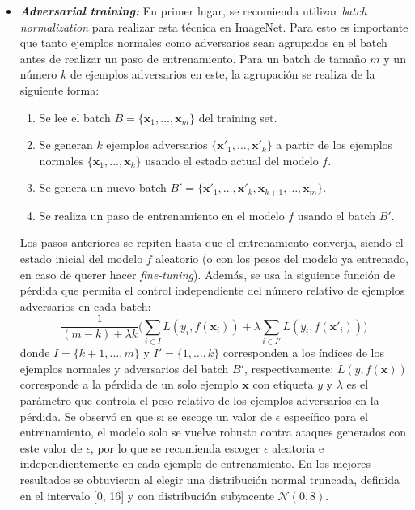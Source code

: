 \documentclass[conference]{IEEEtran}
\begin{document}
\begin{itemize}
	\item \textbf{\textit{Adversarial training:}} En primer lugar, se recomienda utilizar \textit{batch normalization} para realizar esta técnica en ImageNet. Para esto es importante que tanto ejemplos normales como adversarios sean agrupados en el batch antes de realizar un paso de entrenamiento. Para un batch de tamaño $m$ y un número $k$ de ejemplos adversarios en este, la agrupación se realiza de la siguiente forma:
		\begin{enumerate}
			\item Se lee el batch $B=\{\bm{x}_1,\dots,\bm{x}_m\}$ del training set.
			\item Se generan $k$ ejemplos adversarios $\{\bm{x'}_1,\dots,\bm{x'}_k\}$ a partir de los ejemplos normales $\{\bm{x}_1,...,\bm{x}_k\}$ usando el estado actual del modelo $f$.
			\item Se genera un nuevo batch $B'=\{\bm{x'}_1,\dots,\bm{x'}_k,\bm{x}_{k+1},\dots,\bm{x}_m\}$.
			\item Se realiza un paso de entrenamiento en el modelo $f$ usando el batch $B'$.
		\end{enumerate}
Los pasos anteriores se repiten hasta que el entrenamiento converja, siendo el estado inicial del modelo $f$ aleatorio (o con los pesos del modelo ya entrenado, en caso de querer hacer \textit{fine-tuning}). Además, se usa la siguiente función de pérdida que permita el control independiente del número relativo de ejemplos adversarios en cada batch:
\begin{equation}
	\frac{1}{(m-k) + \lambda k}\bigg( \sum_{i \in I} L(y_i, f(\bm{x}_i)) + \lambda \sum_{i \in I'} L(y_i, f(\bm{x'}_i)) \bigg)
\end{equation}
donde $I=\{{k+1},\dots,m\}$ y $I'=\{1,\dots,k\}$ corresponden a los índices de los ejemplos normales y adversarios del batch $B'$, respectivamente; $L(y, f(\bm{x}))$ corresponde a la pérdida de un solo ejemplo $\bm{x}$ con etiqueta $y$ y $\lambda$ es el parámetro que controla el peso relativo de los ejemplos adversarios en la pérdida. Se observó en \cite{kurakin2016} que si se escoge un valor de $\epsilon$ específico para el entrenamiento, el modelo solo se vuelve robusto contra ataques generados con este valor de $\epsilon$, por lo que se recomienda escoger $\epsilon$ aleatoria e independientemente en cada ejemplo de entrenamiento. En \cite{kurakin2016} los mejores resultados se obtuvieron al elegir una distribución normal truncada, definida en el intervalo [0, 16] y con distribución subyacente $\mathcal{N}(0, 8)$.

\end{itemize}
\end{document}
